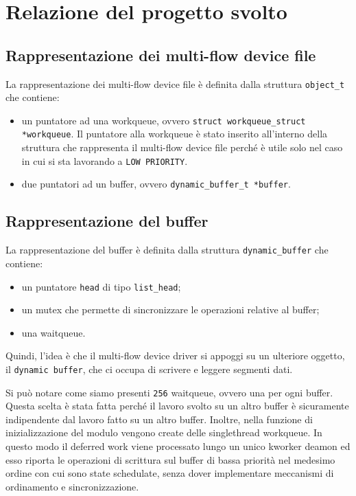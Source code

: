 \documentclass[oneside]{article}
\begin{document}
\section{Relazione del progetto svolto}
\subsection{Rappresentazione dei multi-flow device file}
La rappresentazione dei multi-flow device file è definita dalla struttura \texttt{object\_t} che contiene:
\begin{itemize}
\item un puntatore ad una workqueue, ovvero \texttt{struct workqueue\_struct *workqueue}. Il puntatore alla workqueue è stato inserito all'interno della struttura che rappresenta il multi-flow device file perché è utile solo nel caso in cui si sta lavorando a \texttt{LOW PRIORITY}.
\item due puntatori ad un buffer, ovvero \texttt{dynamic\_buffer\_t *buffer}.
\end{itemize}

\subsection{Rappresentazione del buffer}
La rappresentazione del buffer è definita dalla struttura \texttt{dynamic\_buffer} che contiene:
\begin{itemize}
\item un puntatore \texttt{head} di tipo \texttt{list\_head};
\item un mutex che permette di sincronizzare le operazioni relative al buffer;
\item una waitqueue.
\end{itemize}
Quindi, l'idea è che il multi-flow device driver si appoggi su un ulteriore oggetto, il \texttt{dynamic buffer}, che ci occupa di scrivere e leggere segmenti dati.


Si può notare come siamo presenti \texttt{256} waitqueue, ovvero una per ogni buffer. Questa scelta è stata fatta perché il lavoro svolto su un altro buffer è sicuramente indipendente dal lavoro fatto su un altro buffer. Inoltre, nella funzione di inizializzazione del modulo vengono create delle singlethread workqueue. In questo modo il deferred work viene processato lungo un unico kworker deamon ed esso riporta le operazioni di scrittura sul buffer di bassa priorità nel medesimo ordine con cui sono state schedulate, senza dover implementare meccanismi di ordinamento e sincronizzazione.
\end{document}
